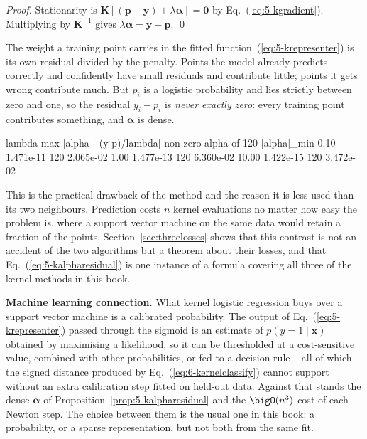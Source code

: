 \begin{proof}
Stationarity is
$\bm{K}[(\bm{p}-\bm{y})+\lambda\bm{\alpha}]=\bm{0}$ by
Eq.~(\ref{eq:5-kgradient}).  Multiplying by $\bm{K}^{-1}$ gives
$\lambda\bm{\alpha}=\bm{y}-\bm{p}$.
\qed
\end{proof}

The weight a training point carries in the fitted
function~(\ref{eq:5-krepresenter}) is its own residual divided by the penalty.
Points the model already predicts correctly and confidently have small
residuals and contribute little; points it gets wrong contribute much.  But
$p_i$ is a logistic probability and lies strictly between zero and one, so the
residual $y_i-p_i$ is \emph{never exactly zero}: every training point
contributes something, and $\bm{\alpha}$ is dense.

\begin{Python}{}
   lambda   max |alpha - (y-p)/lambda|   non-zero alpha of 120   |alpha|_min
     0.10                   1.471e-11                 120   2.065e-02
     1.00                   1.477e-13                 120   6.360e-02
    10.00                   1.422e-15                 120   3.472e-02
\end{Python}

This is the practical drawback of the method and the reason it is less used
than its two neighbours.  Prediction costs $n$ kernel evaluations no matter
how easy the problem is, where a support vector machine on the same data would
retain a fraction of the points.  Section~\ref{sec:threelosses} shows that this
contrast is not an accident of the two algorithms but a theorem about their
losses, and that Eq.~(\ref{eq:5-kalpharesidual}) is one instance of a formula
covering all three of the kernel methods in this book.

\begin{notebox}
\textbf{Machine learning connection.}  What kernel logistic regression buys
over a support vector machine is a calibrated probability.  The output of
Eq.~(\ref{eq:5-krepresenter}) passed through the sigmoid is an estimate of
$p(y=1\mid\bm{x})$ obtained by maximising a likelihood, so it can be
thresholded at a cost-sensitive value, combined with other probabilities, or
fed to a decision rule -- all of which the signed distance produced by
Eq.~(\ref{eq:6-kernelclassify}) cannot support without an extra calibration
step fitted on held-out data.  Against that stands the dense $\bm{\alpha}$ of
Proposition~\ref{prop:5-kalpharesidual} and the $\bigO(n^{3})$ cost of each
Newton step.  The choice between them is the usual one in this book: a
probability, or a sparse representation, but not both from the same fit.
\end{notebox}

